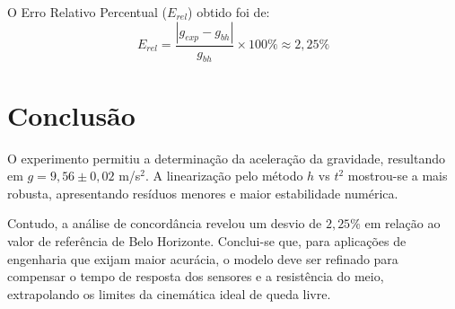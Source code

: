 \documentclass[12pt,a4paper]{article}
\begin{document}
O Erro Relativo Percentual ($E_{rel}$) obtido foi de:
\begin{equation}
    E_{rel} = \frac{|g_{exp} - g_{bh}|}{g_{bh}} \times 100\% \approx 2{,}25\%
\end{equation}

\section{Conclusão}

O experimento permitiu a determinação da aceleração da gravidade, resultando em $g = 9{,}56 \pm 0{,}02$ m/s$^2$. A linearização pelo método $h$ vs $t^2$ mostrou-se a mais robusta, apresentando resíduos menores e maior estabilidade numérica. 

Contudo, a análise de concordância revelou um desvio de $2{,}25\%$ em relação ao valor de referência de Belo Horizonte. Conclui-se que, para aplicações de engenharia que exijam maior acurácia, o modelo deve ser refinado para compensar o tempo de resposta dos sensores e a resistência do meio, extrapolando os limites da cinemática ideal de queda livre.



\end{document}
